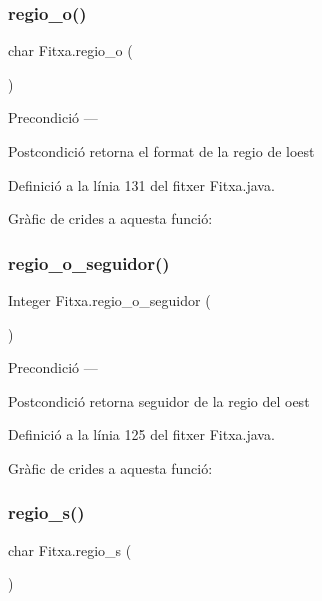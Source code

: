 \subsubsection{\texorpdfstring{regio\+\_\+o()}{regio\_o()}}
{\footnotesize\ttfamily char Fitxa.\+regio\+\_\+o (\begin{DoxyParamCaption}{ }\end{DoxyParamCaption})}

\begin{DoxyPrecond}{Precondició}
--- 
\end{DoxyPrecond}
\begin{DoxyPostcond}{Postcondició}
retorna el format de la regio de l\textquotesingle{}oest 
\end{DoxyPostcond}


Definició a la línia 131 del fitxer Fitxa.\+java.

Gràfic de crides a aquesta funció\+:
\mbox{\label{class_fitxa_a9b57519dc7afcbb734a7073353e62dad}} 
\subsubsection{\texorpdfstring{regio\+\_\+o\+\_\+seguidor()}{regio\_o\_seguidor()}}
{\footnotesize\ttfamily Integer Fitxa.\+regio\+\_\+o\+\_\+seguidor (\begin{DoxyParamCaption}{ }\end{DoxyParamCaption})}

\begin{DoxyPrecond}{Precondició}
--- 
\end{DoxyPrecond}
\begin{DoxyPostcond}{Postcondició}
retorna seguidor de la regio del oest 
\end{DoxyPostcond}


Definició a la línia 125 del fitxer Fitxa.\+java.

Gràfic de crides a aquesta funció\+:
\mbox{\label{class_fitxa_a787f09b27930fedb010afa53ed5b1a29}} 
\subsubsection{\texorpdfstring{regio\+\_\+s()}{regio\_s()}}
{\footnotesize\ttfamily char Fitxa.\+regio\+\_\+s (\begin{DoxyParamCaption}{ }\end{DoxyParamCaption})}

